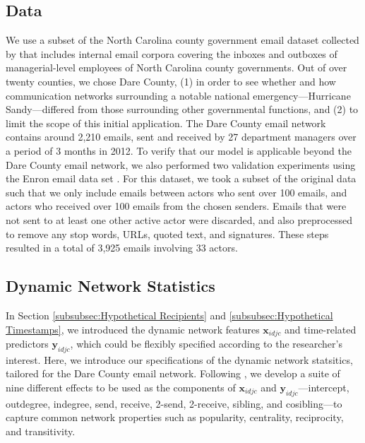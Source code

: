 \documentclass[twoside]{article}
\begin{document}
\subsection{Data}\label{subsec:Data}
We use a subset of the North Carolina county government email dataset collected by \citet{ben2017transparency} that includes internal email corpora covering the inboxes and outboxes of managerial-level employees of North Carolina county governments. Out of over twenty counties, we chose Dare County, (1) in order to see whether and how communication networks surrounding a notable national emergency---Hurricane Sandy---differed from those surrounding other governmental functions, and (2) to limit the scope of this initial application. The Dare County email network contains around 2,210 emails, sent and received by 27 department managers over a period of 3 months in 2012. To verify that our model is applicable beyond the Dare County email network, we also performed two validation experiments using the Enron email data set \citep{klimt2004introducing}. For this dataset, we took a subset of the original data such that we only include emails between actors who sent over 100 emails, and actors who received over 100 emails from the chosen senders. Emails that were not sent to at least one other active actor were discarded, and also preprocessed to remove any stop words, URLs, quoted text, and signatures. These steps resulted in a total of 3,925 emails involving 33 actors. 
\subsection{Dynamic Network Statistics}\label{subsec:Dynamic Network Statistics}
In Section \ref{subsubsec:Hypothetical Recipients} and \ref{subsubsec:Hypothetical Timestamps}, we introduced the dynamic network features $\boldsymbol{x}_{idjc}$ and time-related predictors $\boldsymbol{y}_{idjc}$, which could be flexibly specified according to the researcher's interest. Here, we introduce our specifications of the dynamic network statsitics, tailored for the Dare County email network. Following \cite{PerryWolfe2012}, we develop a suite of nine different effects to be used as the components of  $\boldsymbol{x}_{idjc}$ and $\boldsymbol{y}_{idjc}$---intercept, outdegree, indegree, send, receive, 2-send, 2-receive, sibling, and cosibling---to capture common network properties such as popularity, centrality, reciprocity, and transitivity.
\end{document}
